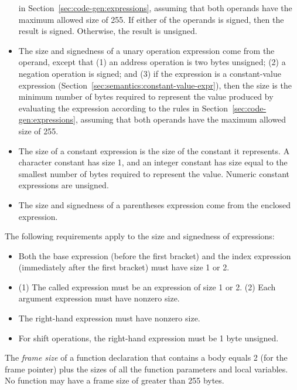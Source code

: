 \documentclass[10pt]{article}
\begin{document}
\begin{itemize}
  in Section~\ref{sec:code-gen:expressions}, assuming that both
  operands have the maximum allowed size of 255.  If either of the
  operands is signed, then the result is signed.  Otherwise, the
  result is unsigned.
%
\item {} The size and signedness of
  a unary operation expression come from the operand, except that (1)
  an address operation  is two bytes unsigned; (2) a negation
  operation is signed; and (3) if the expression is a constant-value
  expression (Section~\ref{sec:semantics:constant-value-expr}), then
  the size is the minimum number of bytes required to represent the
  value produced by evaluating the expression according to the rules
  in Section~\ref{sec:code-gen:expressions}, assuming that both
  operands have the maximum allowed size of 255.
%
\item {} The size of a constant expression is
  the size of the constant it represents.  A character constant has
  size 1, and an integer constant has size equal to the smallest
  number of bytes required to represent the value.  Numeric constant
  expressions are unsigned.
%
\item {} The size and signedness of a
  parentheses expression come from the enclosed expression.
%
\end{itemize}


 The
following requirements apply to the size and signedness of
expressions:
%
\begin{itemize}
%
\item {} Both the base expression (before
  the first bracket) and the index expression (immediately after the
  first bracket) must have size 1 or 2.
%
\item {} (1) The called expression must be an
  expression of size 1 or 2.  (2) Each argument expression must have
  nonzero size.
%
\item {} The right-hand expression must have
  nonzero size.
%
\item {}  For shift operations,
  the right-hand expression must be 1 byte unsigned.
%
\end{itemize}

 The \emph{frame size} of a function
declaration that contains a body equals 2 (for the frame pointer) plus
the sizes of all the function parameters and local variables.  No
function may have a frame size of greater than 255 bytes.
\end{document}
